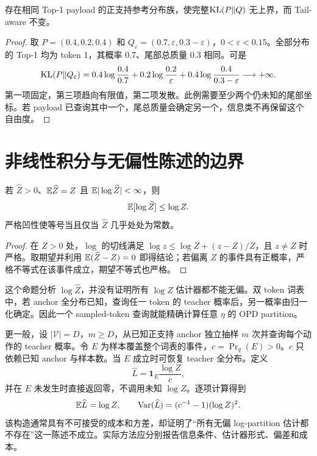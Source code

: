 \begin{proposition}
\label{inf:unbounded}
存在相同 Top-1 payload 的正支持参考分布族，使完整$\operatorname{KL}(P\Vert Q)$ 无上界，而 Tail-aware 不变。
\end{proposition}
\begin{proof}
取 $P=(0.4,0.2,0.4)$ 和 $Q_\varepsilon=(0.7,\varepsilon,0.3-\varepsilon)$，$0<\varepsilon<0.15$。全部分布的 Top-1 均为 token 1，其概率 $0.7$、尾部总质量 $0.3$ 相同。可是
\begin{equation}
\operatorname{KL}(P\Vert Q_\varepsilon)
=0.4\log\frac{0.4}{0.7}+0.2\log\frac{0.2}{\varepsilon}
+0.4\log\frac{0.4}{0.3-\varepsilon}\longrightarrow+\infty.
\end{equation}
第一项固定，第三项趋向有限值，第二项发散。此例需要至少两个仍未知的尾部坐标。若 payload 已查询其中一个，尾总质量会确定另一个，信息类不再保留这个自由度。
\end{proof}

\section{非线性积分与无偏性陈述的边界}
\label{inf:nonlinear}

\begin{proposition}
\label{inf:jensen}
若 $\widehat Z>0$、$\mathbb E\widehat Z=Z$ 且 $\mathbb E|\log\widehat Z|<\infty$，则
\begin{equation}
\mathbb E[\log\widehat Z]\leq\log Z.
\end{equation}
严格凹性使等号当且仅当 $\widehat Z$ 几乎处处为常数。
\end{proposition}
\begin{proof}
在 $Z>0$ 处，$\log$ 的切线满足 $\log z\leq\log Z+(z-Z)/Z$，且 $z\ne Z$ 时严格。取期望并利用 $\mathbb E(\widehat Z-Z)=0$ 即得结论；若偏离 $Z$ 的事件具有正概率，严格不等式在该事件成立，期望不等式也严格。
\end{proof}

这个命题分析 $\log\widehat Z$，并没有证明所有 $\log Z$ 估计器都不能无偏。双 token 词表中，若 anchor 全分布已知，查询任一 token 的 teacher 概率后，另一概率由归一化确定。因此一个 sampled-token 查询就能精确计算任意 $\eta$ 的 OPD partition。

更一般，设 $|\mathcal V|=D$，$m\geq D$，从已知正支持 anchor 独立抽样 $m$ 次并查询每个动作的 teacher 概率。令 $E$ 为样本覆盖整个词表的事件，$c=\Pr_q(E)>0$。$c$ 只依赖已知 anchor 与样本数。当 $E$ 成立时可恢复 teacher 全分布。定义
\begin{equation}
\widehat L=\mathbf1_E\frac{\log Z}{c},
\end{equation}
并在 $E$ 未发生时直接返回零，不调用未知 $\log Z$。逐项计算得到
\begin{equation}
\mathbb E\widehat L=\log Z,\qquad
\operatorname{Var}(\widehat L)=(c^{-1}-1)(\log Z)^2.
\end{equation}
该构造通常具有不可接受的成本和方差，却证明了“所有无偏 log-partition 估计都不存在”这一陈述不成立。实际方法应分别报告信息条件、估计器形式、偏差和成本。

